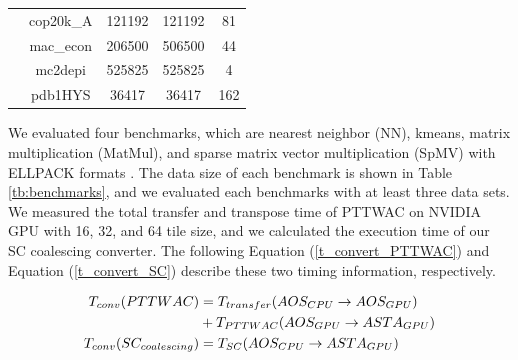 \documentclass[10pt,journal,compsoc]{IEEEtran}
\begin{document}
\begin{table}[]
\begin{tabular}{|c|c|c|c|c|}
                                                                                                & cop20k\_A                                                      & 121192                                                & 121192                                                  & 81                                                        \\
                                                                                                & mac\_econ                                                      & 206500                                                & 506500                                                  & 44                                                        \\
                                                                                                & mc2depi                                                        & 525825                                                & 525825                                                  & 4                                                         \\
                                                                                                & pdb1HYS                                                        & 36417                                                 & 36417                                                   & 162                                                       \\ \hline
\end{tabular}
\end{table}

We evaluated four benchmarks, which
are nearest neighbor (NN), kmeans, matrix multiplication (MatMul), and sparse matrix vector multiplication (SpMV) with ELLPACK formats \cite{rodinia:}\cite{ASTA}\cite{AutoSpMV}. The data size of each benchmark is shown in Table \ref{tb:benchmarks}, and we evaluated each benchmarks with at least three data sets.
We measured the total transfer and transpose time of PTTWAC on NVIDIA GPU with 16, 32, and 64 tile size,
and we calculated the execution time of our SC coalescing converter.
The following Equation (\ref{t_convert_PTTWAC}) and Equation (\ref{t_convert_SC}) describe these two timing information, respectively.

\begin{align}
T_{conv}(PTTWAC)&= T_{transfer}(AOS_{CPU}\rightarrow AOS_{GPU}) \notag \\
&+ T_{PTTWAC}(AOS_{GPU}\rightarrow ASTA_{GPU}) \label{t_convert_PTTWAC}\\
T_{conv}(SC_{coalescing})&=
T_{SC}(AOS_{CPU}\rightarrow  ASTA_{GPU})  \label{t_convert_SC}
\end{align}
\end{document}
